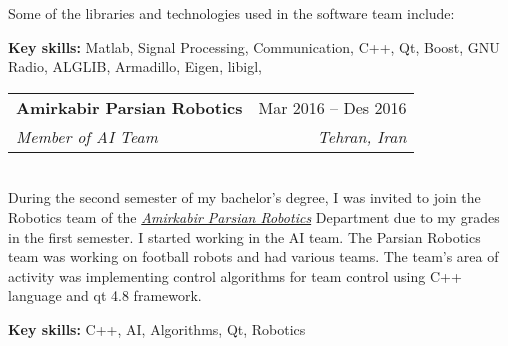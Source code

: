 \documentclass[a4paper,11pt]{article}
\makeatletter
\newcommand{\resumeItem}[1]{
\item{\small{#1}}
}
\newcommand{\resumeItemListStart}{\begin{itemize}[rightmargin=0.11in]}
\newcommand{\resumeItemListEnd}{\end{itemize}}
\newcommand{\resumeQuadHeading}[4]{
\item
\begin{tabular*}{0.96\textwidth}[t]{l@{\extracolsep{\fill}}r}
\textbf{#1} & #2 \\
\textit{\small#3} & \textit{\small #4} \\
\end{tabular*}
}
\makeatother
\begin{document}
Some of the libraries and technologies used in the software team include:


\textbf{Key skills:} Matlab, Signal Processing, Communication, C++, Qt, Boost, GNU Radio, ALGLIB, Armadillo, Eigen, libigl,



\resumeQuadHeading{Amirkabir Parsian Robotics}{Mar 2016 -- Des 2016}
{Member of AI Team}{Tehran, Iran}\\
During the second semester of my bachelor's degree, I was invited to join the Robotics team of the \href{http://www.parsianrobotics.aut.ac.ir/}{\textit{Amirkabir Parsian Robotics}} Department due to my grades in the first semester.
I started working in the AI team. The Parsian Robotics team was working on football robots and had various teams. The team's area of activity was implementing control algorithms for team control using C++ language and qt 4.8 framework.

\textbf{Key skills:} C++, AI, Algorithms, Qt, Robotics
\end{document}
